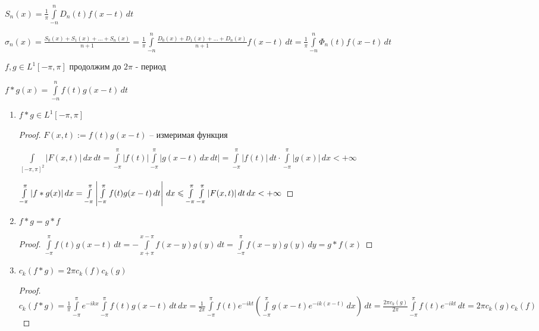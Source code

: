 $S_n(x) = \frac{1}{\pi} \int\limits_{-n}^nD_n(t)f(x - t)\, dt$

$\sigma_n(x) = \frac{S_0(x) + S_1(x) + \ldots + S_n(x)}{n+1} = \frac{1}{\pi} \int\limits_{-n}^n\frac{D_0(x) + D_1(x) + \ldots + D_n(x)}{n+1} f(x - t) \,dt = \frac{1}{\pi}\int\limits_{-n}^n \Phi_n(t) f(x - t)\,dt$

\begin{definition}\thmslashn

	$f, g \in L^1[-\pi, \pi]$ продолжим до $2\pi$ - период
	
	$f*g(x) = \int\limits_{-n}^n f(t) g(x -t)\,dt$

\end{definition}

\begin{consequences}\thmslashn
	
	\begin{enumerate}
		\item 
		$f*g \in L^1[-\pi, \pi]$
		
		\begin{proof}\thmslashn
			
			$F(x, t) := f(t)g(x - t)$ -- измеримая функция
			
			$\int\limits_{[-\pi, \pi]^2}|F(x, t)|\,dx\,dt = \int\limits_{-\pi}^\pi |f(t)|\int\limits_{-\pi}^\pi |g(x - t)\,dx\,dt| = \int\limits_{-\pi}^\pi |f(t)|\,dt \cdot \int\limits_{-\pi}^\pi |g(x)|\,dx < +\infty$
			
			$\int\limits_{-\pi}^\pi |f * g(x)|\,dx = \int\limits_{-\pi}^\pi\left|\int\limits_{-\pi}^\pi f(t)g(x - t)\,dt\right|\,dx \leqslant \int\limits_{-\pi}^\pi\int\limits_{-\pi}^\pi|F(x, t)|\,dt\,dx < +\infty$
			
		\end{proof}
	
		\item
		$f*g = g*f$
		
		\begin{proof}\thmslashn
			
			$\int\limits_{-\pi}^\pi f(t) g(x - t)\,dt = - \int\limits_{x + \pi}^{x- \pi} f(x - y)g(y)\,dt = \int\limits_{-\pi}^\pi f(x - y)g(y)\,dy = g*f(x)$
		
		\end{proof}
	
		\item
		$c_k(f*g) = 2\pi c_k(f)c_k(g)$
		
		\begin{proof}\thmslashn
			
			$c_k(f*g) = \frac{1}{\pi} \int\limits_{-\pi}^\pi  e^{-i k x} \int\limits_{-\pi}^\pi  f(t) g(x - t)\,dt \,dx = \frac{1}{2\pi} \int\limits_{-\pi}^\pi f(t)e^{-ikt}\left( \int\limits_{-\pi}^\pi g(x - t) e^{-ik(x - t)}\,dx \right)\,dt = \frac{2\pi c_k(g)}{2\pi} \int\limits_{-\pi}^\pi f(t)e^{-ikt}\,dt = 2\pi c_k(g)c_k(f)$
		

\end{proof}
\end{enumerate}
\end{consequences}
